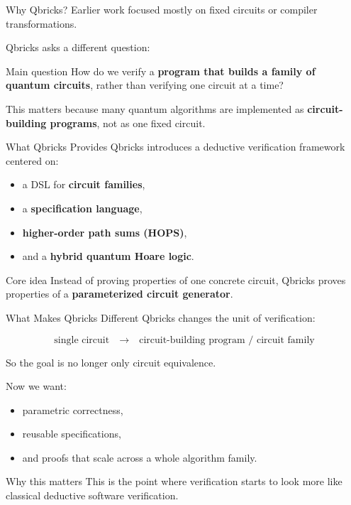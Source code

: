\documentclass[aspectratio=169]{beamer}
\begin{document}
\begin{frame}{Why Qbricks?}
\justifying
Earlier work focused mostly on fixed circuits or compiler transformations.

\vspace{0.7em}
Qbricks asks a different question:

\begin{block}{Main question}
How do we verify a \textbf{program that builds a family of quantum circuits},
rather than verifying one circuit at a time?
\end{block}

\vspace{0.7em}
This matters because many quantum algorithms are implemented as
\textbf{circuit-building programs}, not as one fixed circuit. 
\end{frame}
\begin{frame}{What Qbricks Provides}
\justifying
Qbricks introduces a deductive verification framework centered on:
\begin{itemize}
    \item a DSL for \textbf{circuit families},
    \item a \textbf{specification language},
    \item \textbf{higher-order path sums (HOPS)},
    \item and a \textbf{hybrid quantum Hoare logic}.
\end{itemize}

\vspace{0.7em}
\begin{block}{Core idea}
Instead of proving properties of one concrete circuit,
Qbricks proves properties of a \textbf{parameterized circuit generator}.
\end{block}
\end{frame}
\begin{frame}{What Makes Qbricks Different}
\justifying
Qbricks changes the unit of verification:

\vspace{0.7em}
\[
\text{single circuit}
\quad\longrightarrow\quad
\text{circuit-building program / circuit family}
\]

\vspace{0.7em}
So the goal is no longer only circuit equivalence.

Now we want:
\begin{itemize}
    \item parametric correctness,
    \item reusable specifications,
    \item and proofs that scale across a whole algorithm family.
\end{itemize}

\vspace{0.7em}
\begin{alertblock}{Why this matters}
This is the point where verification starts to look more like
classical deductive software verification.
\end{alertblock}
\end{frame}
\end{document}
